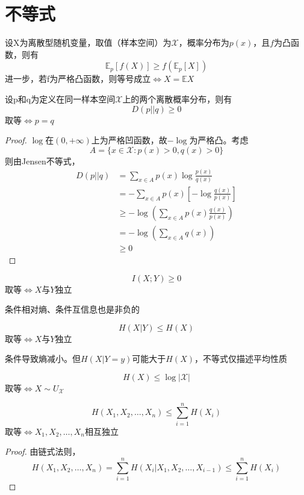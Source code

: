 \documentclass{ctexbook}
\begin{document}
\section{不等式}

\begin{theorem}[Jensen不等式]
    设X为离散型随机变量，取值（样本空间）为$\mathcal{X}$，概率分布为$p(x)$，且$f$为凸函数，则有
    \[\mathbb{E} _p[f(X)] \geq f(\mathbb{E} _p[X])\]
    进一步，若f为严格凸函数，则等号成立$\iff X=\mathbb{E}X$
\end{theorem}

\begin{theorem}[信息不等式]
    设p和q为定义在同一样本空间$\mathcal{X}$上的两个离散概率分布，则有
    \[D(p||q) \geq 0\]
    取等$\iff p=q$    
\end{theorem}
\begin{proof}
    $\log$在$(0,+\infty)$上为严格凹函数，故$-\log$为严格凸。考虑
    \[A=\{x\in \mathcal{X}: p(x)>0,q(x)>0\}\]
    则由Jensen不等式，
    \begin{align*}
        D(p||q) &= \sum_{x \in A} p(x) \log \frac{p(x)}{q(x)} \\
        &= -\sum_{x \in A} p(x) \left[-\log \frac{q(x)}{p(x)}\right] \\
        &\geq -\log \left(\sum_{x \in A} p(x) \frac{q(x)}{p(x)}\right) \\
        &= -\log \left(\sum_{x \in A} q(x)\right) \\
        &\geq 0
    \end{align*}
\end{proof}
\begin{corollary}
    \[I(X;Y) \geq 0\]
    取等$\iff X$与$Y$独立

    条件相对熵、条件互信息也是非负的
\end{corollary}
\begin{corollary}
    \[H(X|Y) \leq H(X)\]
    取等$\iff X$与$Y$独立
\end{corollary}
\begin{remark}
    条件导致熵减小。但$H(X|Y=y)$可能大于$H(X)$，不等式仅描述平均性质
\end{remark}

\begin{theorem}
    \[H(X) \leq \log |\mathcal{X}|\]
    取等$\iff X\sim U_{\mathcal{X} }$
\end{theorem}
\begin{corollary}[熵的独立界]
    \[H(X_1,X_2,\ldots,X_n) \leq \sum_{i=1}^n H(X_i)\]
    取等$\iff X_1,X_2,\ldots,X_n$相互独立
\end{corollary}
\begin{proof}
    由链式法则，
    \[H(X_1,X_2,\ldots,X_n) = \sum_{i=1}^n H(X_i|X_{1},X_{2},\ldots,X_{i-1}) \leq \sum_{i=1}^n H(X_i)\]
\end{proof}
\end{document}
